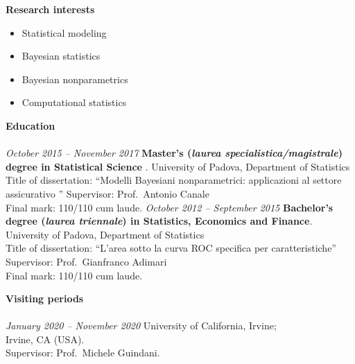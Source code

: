 \documentclass[10pt]{amsart}
\begin{document}
	{\large {\bf Research interests}} \\[-.08cm] 
	\underline{\hspace{6in}} 
	\begin{itemize}
	\item 	Statistical modeling
	\item 	Bayesian statistics
	\item	Bayesian nonparametrics
	\item 	Computational statistics
	\end{itemize}
		\vspace{2ex}
	{\large {\bf Education}} \\[-.08cm] 
	\underline{\hspace{6in}} \\[.2cm] 
		{\it October 2015 -- November 2017 } \newline
	{\bf Master's ({\it laurea specialistica/magistrale}) degree in Statistical Science  }.\newline
	University of Padova, Department of Statistics \newline
	Title of dissertation: ``Modelli Bayesiani nonparametrici: applicazioni al settore assicurativo   '' \newline
	 	Supervisor: Prof.\ Antonio Canale\\
	Final mark: 110/110 cum laude.
	\newline\newline
	 	{\it October 2012 -- September 2015} \newline
	{\bf Bachelor's degree ({\it laurea triennale}) in Statistics, Economics and Finance}. \newline
	University of Padova, Department of Statistics \\
	Title of dissertation: ``L’area sotto la curva ROC specifica per caratteristiche'' \newline
	Supervisor: Prof.\  Gianfranco Adimari\\
	Final mark:  110/110 cum laude.
	\newline\newline
	  
	{\large {\bf Visiting periods}} \\[-.08cm] 
	\underline{\hspace{6in}}\\[.2cm] 
	{\it January 2020 -- November 2020 }\newline
	University of California, Irvine;\\ Irvine, CA (USA).\\
	Supervisor: Prof.\ Michele Guindani. \newline
	\\
\end{document}
